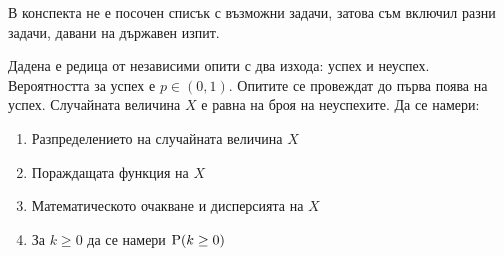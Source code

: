 \documentclass{../../common/topic}
\begin{document}
В конспекта не е посочен списък с възможни задачи, затова съм включил разни задачи, давани на държавен изпит.

\begin{problem}\label{ex:se_summer2014}
  Дадена е редица от независими опити с два изхода: успех и неуспех. Вероятността за успех е \( p \in (0, 1) \). Опитите се провеждат до първа поява на успех. Случайната величина \( X \) е равна на броя на неуспехите. Да се намери:
  \begin{enumerate}[label=\alph*)]
    \item Разпределението на случайната величина \( X \)
    \item Пораждащата функция на \( X \)
    \item Математическото очакване и дисперсията на \( X \)
    \item За \( k \geq 0 \) да се намери \( \operatorname{P}(k \geq 0) \)
  \end{enumerate}
\end{problem}
\end{document}
